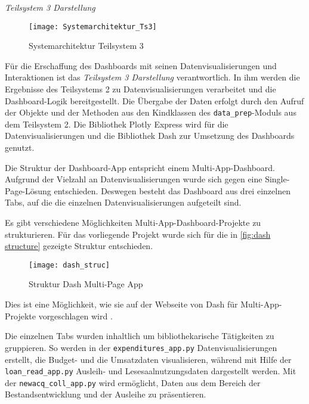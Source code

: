     \noindent
    \textit{Teilsystem 3 Darstellung}\\

    \begin{figure}[H]
        \centering
            \texttt{[image: Systemarchitektur\_Ts3]}
            \caption{Systemarchitektur Teilsystem 3}
            \label{fig:Systemarchitektur Teilsystem 3}
    \end{figure}

    Für die Erschaffung des Dashboards mit seinen Datenvisualisierungen und Interaktionen ist das \textit{Teilsystem 3 Darstellung} verantwortlich.
    In ihm werden die Ergebnisse des Teilsystems 2 zu Datenvisualisierungen verarbeitet und die Dashboard-Logik bereitgestellt.
    Die Übergabe der Daten erfolgt durch den Aufruf der Objekte und der Methoden aus den Kindklassen des \texttt{data\_prep}-Moduls aus dem Teilsystem 2.
    Die Bibliothek Plotly Express  wird für die Datenvisualisierungen und die Bibliothek Dash zur Umsetzung des Dashboards genutzt. 
    
    Die Struktur der Dashboard-App entspricht einem Multi-App-Dashboard.
    Aufgrund der Vielzahl an Datenvisualisierungen wurde sich gegen eine Single-Page-Lösung entschieden. Deswegen besteht das Dashboard
    aus drei einzelnen Tabs, auf die die einzelnen Datenvisualisierungen aufgeteilt sind.
    
    Es gibt verschiedene Möglichkeiten Multi-App-Dashboard-Projekte zu strukturieren. Für das vorliegende Projekt wurde sich für die in 
    \autoref{fig:dash structure} gezeigte Struktur entschieden.

    \begin{figure}[H]
        \centering
            \texttt{[image: dash\_struc]}
            \caption{Struktur Dash Multi-Page App}
            \label{fig:dash structure}
    \end{figure}
    
    Dies ist eine Möglichkeit, wie sie auf der Webseite von Dash für Multi-App-Projekte vorgeschlagen wird \cite[vgl.][]{plotly_url_2021}.
    
    Die einzelnen Tabs wurden inhaltlich um bibliothekarische Tätigkeiten zu gruppieren. So werden in der \texttt{expenditures\_app.py}
    Datenvisualisierungen erstellt, die Budget- und die Umsatzdaten visualisieren, während mit Hilfe der \texttt{loan\_read\_app.py}
    Ausleih- und Lesesaalnutzungsdaten dargestellt werden. Mit der \texttt{newacq\_coll\_app.py} wird ermöglicht, Daten aus dem Bereich der Bestandsentwicklung und der 
    Ausleihe zu präsentieren.

